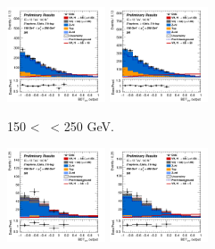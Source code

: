 \begin{figure}[h!]
\begin{subfigure}[b]{\textwidth}
        \includegraphics[width=0.32\textwidth]{Images/VH/Own_fit/postfit_VHbb/Region_distmva_BMax250_BMin150_DSR_J3_TTypebb_T2_L2_Y6051_GlobalFit_conditionnal_mu1.png}
        \includegraphics[width=0.32\textwidth]{Images/VH/Own_fit/postfit_VHbb/Region_distmva_BMax250_BMin150_DSR_J4_TTypebb_incJet1_T2_L2_Y6051_GlobalFit_conditionnal_mu1.png}
        \caption{150 < \ptv\ < 250 GeV.}
        \label{fig:plots_VHbb_2L_150_SR}
    \end{subfigure}
    \begin{subfigure}[b]{\textwidth}
        \centering
        \includegraphics[width=0.32\textwidth]{Images/VH/Own_fit/postfit_VHbb/Region_distmva_BMax400_BMin250_DSR_J2_TTypebb_T2_L2_Y6051_GlobalFit_conditionnal_mu1.png}
        \includegraphics[width=0.32\textwidth]{Images/VH/Own_fit/postfit_VHbb/Region_distmva_BMax400_BMin250_DSR_J3_TTypebb_T2_L2_Y6051_GlobalFit_conditionnal_mu1.png}

\end{subfigure}
\end{figure}
